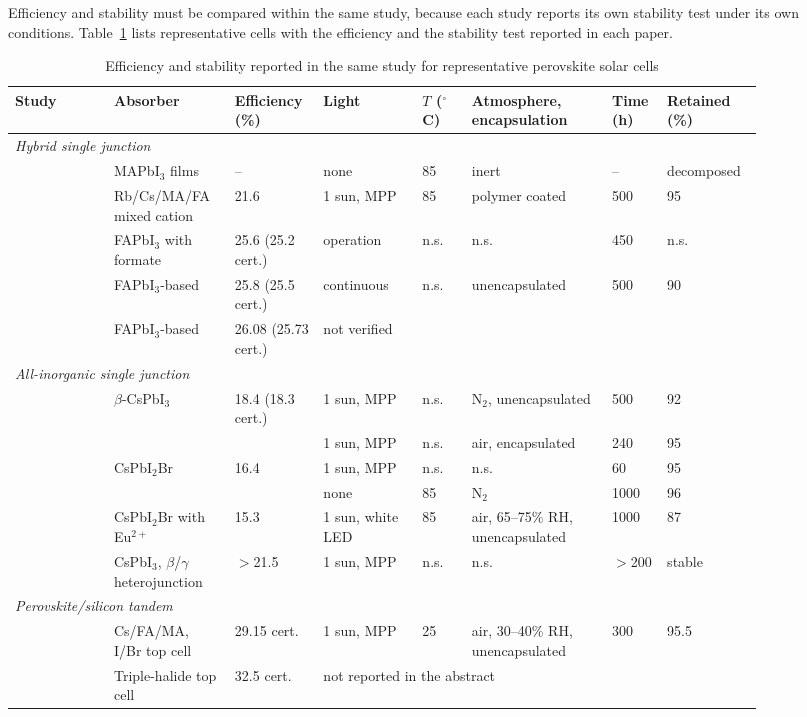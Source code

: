 Efficiency and stability must be compared within the same study, because each study reports its own stability test under its own conditions. Table~\ref{tab:landscape} lists representative cells with the efficiency and the stability test reported in each paper.

\begin{table}[htbp]
  \centering
  \caption{Efficiency and stability reported in the same study for representative perovskite solar cells}
  \label{tab:landscape}
  \scriptsize
  \setlength{\tabcolsep}{3pt}
  \begin{tabular}{p{0.12\linewidth}p{0.14\linewidth}p{0.09\linewidth}p{0.12\linewidth}p{0.06\linewidth}p{0.17\linewidth}p{0.06\linewidth}p{0.11\linewidth}}
    \toprule
    Study & Absorber & Efficiency (\%) & Light & $T$ ($^\circ$C) & Atmosphere, encapsulation & Time (h) & Retained (\%) \\
    \midrule
    \multicolumn{8}{l}{\textit{Hybrid single junction}} \\
    \citet{Conings2015} & MAPbI$_3$ films & -- & none & 85 & inert & -- & decomposed \\
    \citet{Saliba2016Rb} & Rb/Cs/MA/FA mixed cation & 21.6 & 1 sun, MPP & 85 & polymer coated & 500 & 95 \\
    \citet{Jeong2021} & FAPbI$_3$ with formate & 25.6 (25.2 cert.) & operation & n.s. & n.s. & 450 & n.s. \\
    \citet{Min2021} & FAPbI$_3$-based & 25.8 (25.5 cert.) & continuous & n.s. & unencapsulated & 500 & 90 \\
    \citet{Park2023} & FAPbI$_3$-based & 26.08 (25.73 cert.) & \multicolumn{5}{l}{not verified} \\
    \midrule
    \multicolumn{8}{l}{\textit{All-inorganic single junction}} \\
    \citet{Wang2019} & $\beta$-CsPbI$_3$ & 18.4 (18.3 cert.) & 1 sun, MPP & n.s. & N$_2$, unencapsulated & 500 & 92 \\
     & & & 1 sun, MPP & n.s. & air, encapsulated & 240 & 95 \\
    \citet{Xue2020} & CsPbI$_2$Br & 16.4 & 1 sun, MPP & n.s. & n.s. & 60 & 95 \\
     & & & none & 85 & N$_2$ & 1000 & 96 \\
    \citet{Mali2021} & CsPbI$_2$Br with Eu$^{2+}$ & 15.3 & 1 sun, white LED & 85 & air, 65--75\% RH, unencapsulated & 1000 & 87 \\
    \citet{Mali2023} & CsPbI$_3$, $\beta$/$\gamma$ heterojunction & $>$21.5 & 1 sun, MPP & n.s. & n.s. & $>$200 & stable \\
    \midrule
    \multicolumn{8}{l}{\textit{Perovskite/silicon tandem}} \\
    \citet{AlAshouri2020} & Cs/FA/MA, I/Br top cell & 29.15 cert. & 1 sun, MPP & 25 & air, 30--40\% RH, unencapsulated & 300 & 95.5 \\
    \citet{Mariotti2023} & Triple-halide top cell & 32.5 cert. & \multicolumn{5}{l}{not reported in the abstract} \\
    \bottomrule
  \end{tabular}


\end{table}
